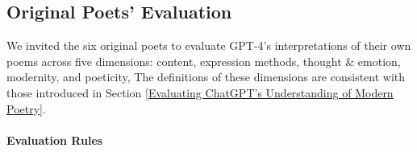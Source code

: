 \documentclass[11pt]{article}
\begin{document}
\subsection{Original Poets’ Evaluation}
\label{Original Poets Evaluation}

We invited the six original poets to evaluate GPT-4’s interpretations of their own poems across five dimensions: content, expression methods, thought \& emotion, modernity, and poeticity, The definitions of these dimensions are consistent with those introduced in Section \ref{Evaluating ChatGPT’s Understanding of Modern Poetry}.













\paragraph{Evaluation Rules}
\end{document}
